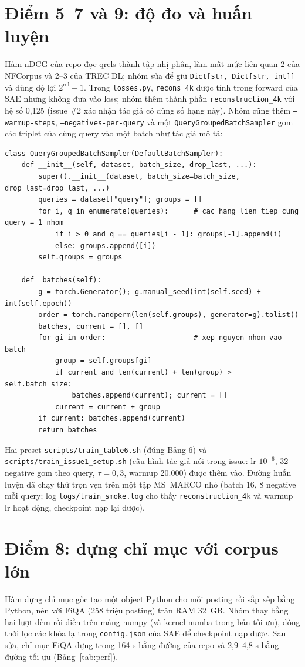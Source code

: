 \documentclass[a4paper,13pt]{extreport}
\theoremstyle{plain}
\begin{document}
\section{Điểm 5--7 và 9: độ đo và huấn luyện}
Hàm nDCG của repo đọc qrels thành tập nhị phân, làm mất mức liên quan 2 của NFCorpus và 2--3 của TREC DL; nhóm sửa để giữ \texttt{Dict[str, Dict[str, int]]} và dùng độ lợi $2^{\mathrm{rel}}-1$. Trong \texttt{losses.py}, \texttt{recons\_4k} được tính trong forward của SAE nhưng không đưa vào loss; nhóm thêm thành phần \texttt{reconstruction\_4k} với hệ số 0,125 (issue \#2 xác nhận tác giả có dùng số hạng này). Nhóm cũng thêm \texttt{--warmup-steps}, \texttt{--negatives-per-query} và một \texttt{QueryGroupedBatchSampler} gom các triplet của cùng query vào một batch như tác giả mô tả:
\begin{lstlisting}[caption={\texttt{ssr/samplers.py}: gom triplet cùng query vào một batch.}]
class QueryGroupedBatchSampler(DefaultBatchSampler):
    def __init__(self, dataset, batch_size, drop_last, ...):
        super().__init__(dataset, batch_size=batch_size, drop_last=drop_last, ...)
        queries = dataset["query"]; groups = []
        for i, q in enumerate(queries):      # cac hang lien tiep cung query = 1 nhom
            if i > 0 and q == queries[i - 1]: groups[-1].append(i)
            else: groups.append([i])
        self.groups = groups

    def _batches(self):
        g = torch.Generator(); g.manual_seed(int(self.seed) + int(self.epoch))
        order = torch.randperm(len(self.groups), generator=g).tolist()
        batches, current = [], []
        for gi in order:                     # xep nguyen nhom vao batch
            group = self.groups[gi]
            if current and len(current) + len(group) > self.batch_size:
                batches.append(current); current = []
            current = current + group
        if current: batches.append(current)
        return batches
\end{lstlisting}
Hai preset \texttt{scripts/train\_table6.sh} (đúng Bảng 6) và \texttt{scripts/train\_issue1\_setup.sh} (cấu hình tác giả nói trong issue: lr $10^{-6}$, 32 negative gom theo query, $\tau=0{,}3$, warmup 20.000) được thêm vào. Đường huấn luyện đã chạy thử trọn vẹn trên một tập MS~MARCO nhỏ (batch 16, 8 negative mỗi query; log \texttt{logs/train\_smoke.log} cho thấy \texttt{reconstruction\_4k} và warmup lr hoạt động, checkpoint nạp lại được).

\section{Điểm 8: dựng chỉ mục với corpus lớn}
Hàm dựng chỉ mục gốc tạo một object Python cho mỗi posting rồi sắp xếp bằng Python, nên với FiQA (258 triệu posting) tràn RAM 32~GB. Nhóm thay bằng hai lượt đếm rồi điền trên mảng numpy (và kernel numba trong bản tối ưu), đồng thời lọc các khóa lạ trong \texttt{config.json} của SAE để checkpoint nạp được. Sau sửa, chỉ mục FiQA dựng trong 164 s bằng đường của repo và 2,9--4,8 s bằng đường tối ưu (Bảng~\ref{tab:perf}).
\end{document}
